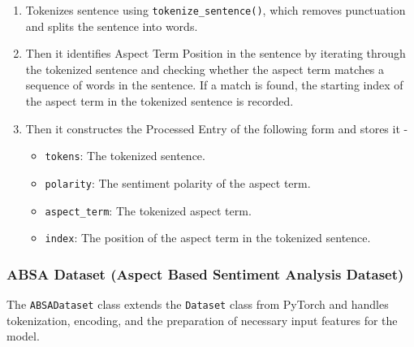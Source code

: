 \documentclass{article}
\begin{document}
\begin{enumerate}
\item Tokenizes sentence using \texttt{tokenize\_sentence()}, which removes punctuation and splits the sentence into words.

\item Then it identifies Aspect Term Position in the sentence by iterating through the tokenized sentence and checking whether the aspect term matches a sequence of words in the sentence. If a match is found, the starting index of the aspect term in the tokenized sentence is recorded.

\item Then it constructes the Processed Entry of the following form and stores it - 
\begin{itemize}
    \item \texttt{tokens}: The tokenized sentence.
    \item \texttt{polarity}: The sentiment polarity of the aspect term.
    \item \texttt{aspect\_term}: The tokenized aspect term.
    \item \texttt{index}: The position of the aspect term in the tokenized sentence.
\end{itemize}

\end{enumerate}

\subsubsection{ABSA Dataset (Aspect Based Sentiment Analysis Dataset)}

The \texttt{ABSADataset} class extends the \texttt{Dataset} class from PyTorch and handles tokenization, encoding, and the preparation of necessary input features for the model.
\end{document}
